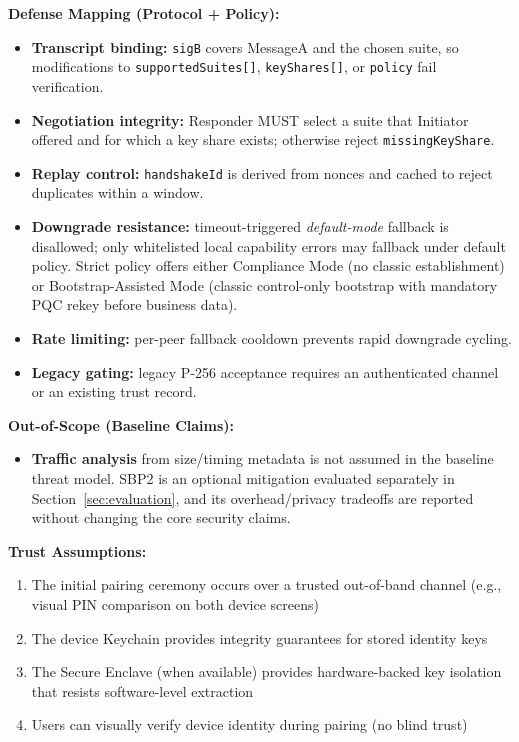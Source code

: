 \documentclass[10pt,journal,compsoc]{IEEEtran}
\providecommand{\tightlist}{%
  \setlength{\itemsep}{0pt}\setlength{\parskip}{0pt}}
\newcommand{\nbcode}[1]{\mbox{\texttt{#1}}}
\begin{document}
\textbf{Defense Mapping (Protocol + Policy):}
\begin{itemize}\tightlist
\item
  \textbf{Transcript binding:} \texttt{sigB} covers MessageA and the
  chosen suite, so modifications to \nbcode{supportedSuites[]},
  \nbcode{keyShares[]}, or \texttt{policy} fail verification.
\item
  \textbf{Negotiation integrity:} Responder MUST select a suite that
  Initiator offered and for which a key share exists; otherwise reject
  \texttt{missingKeyShare}.
\item
  \textbf{Replay control:} \texttt{handshakeId} is derived from nonces
  and cached to reject duplicates within a window.
\item
  \textbf{Downgrade resistance:} timeout-triggered \emph{default-mode}
  fallback is disallowed; only whitelisted local capability errors may
  fallback under default policy. Strict policy offers either Compliance
  Mode (no classic establishment) or Bootstrap-Assisted Mode (classic
  control-only bootstrap with mandatory PQC rekey before business data).
\item
  \textbf{Rate limiting:} per-peer fallback cooldown prevents rapid
  downgrade cycling.
\item
  \textbf{Legacy gating:} legacy P-256 acceptance requires an
  authenticated channel or an existing trust record.
\end{itemize}

\textbf{Out-of-Scope (Baseline Claims):}
\begin{itemize}\tightlist
\item
  \textbf{Traffic analysis} from size/timing metadata is not assumed in
  the baseline threat model. SBP2 is an optional mitigation evaluated
  separately in Section~\ref{sec:evaluation}, and its overhead/privacy
  tradeoffs are reported without changing the core security claims.
\end{itemize}

\textbf{Trust Assumptions:}
\begin{enumerate}\tightlist
\item
  The initial pairing ceremony occurs over a trusted out-of-band
  channel (e.g., visual PIN comparison on both device screens)
\item
  The device Keychain provides integrity guarantees for stored identity
  keys
\item
  The Secure Enclave (when available) provides hardware-backed key
  isolation that resists software-level extraction
\item
  Users can visually verify device identity during pairing (no blind
  trust)
\end{enumerate}
\end{document}
